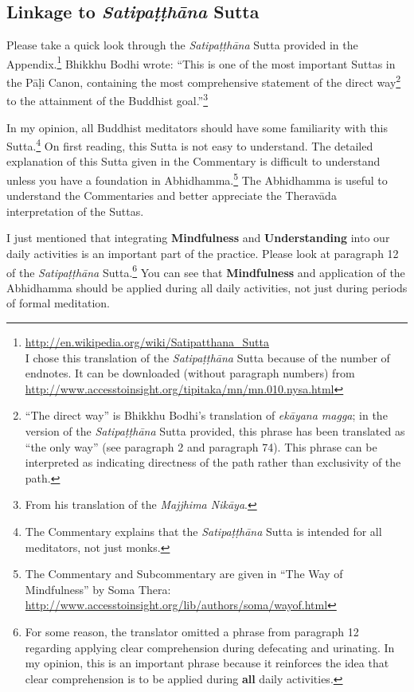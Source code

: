 \subsection*{Linkage to \textit{Satipaṭṭhāna} Sutta}

Please take a quick look through the \textit{Satipaṭṭhāna} Sutta provided in the Appendix.\footnote{\url{http://en.wikipedia.org/wiki/Satipatthana_Sutta} \\ I chose this translation of the \textit{Satipaṭṭhāna} Sutta because of the number of endnotes. It can be downloaded (without paragraph numbers) from \url{http://www.accesstoinsight.org/tipitaka/mn/mn.010.nysa.html}} Bhikkhu Bodhi wrote: “This is one of the most important Suttas in the Pāḷi Canon, containing the most comprehensive statement of the direct way\footnote{“The direct way” is Bhikkhu Bodhi's translation of \textit{ekāyana magga}; in the version of the \textit{Satipaṭṭhāna} Sutta provided, this phrase has been translated as “the only way” (see paragraph 2 and paragraph 74). This phrase can be interpreted as indicating directness of the path rather than exclusivity of the path.} to the attainment of the Buddhist goal.”\footnote{From his translation of the \textit{Majjhima Nikāya}.} 

In my opinion, all Buddhist meditators should have some familiarity with this Sutta.\footnote{The Commentary explains that the \textit{Satipaṭṭhāna} Sutta is intended for all meditators, not just monks.} On first reading, this Sutta is not easy to understand. The detailed explanation of this Sutta given in the Commentary is difficult to understand unless you have a foundation in Abhidhamma.\footnote{The Commentary and Subcommentary are given in “The Way of Mindfulness” by Soma Thera: \url{http://www.accesstoinsight.org/lib/authors/soma/wayof.html}} The Abhidhamma is useful to understand the Commentaries and better appreciate the Theravāda interpretation of the Suttas.

I just mentioned that integrating \textbf{Mindfulness} and \textbf{Understanding} into our daily activities is an important part of the practice. Please look at paragraph 12 of the \textit{Satipaṭṭhāna} Sutta.\footnote{For some reason, the translator omitted a phrase from paragraph 12 regarding applying clear comprehension during defecating and urinating. In my opinion, this is an important phrase because it reinforces the idea that clear comprehension is to be applied during \textbf{all} daily activities.} You can see that \textbf{Mindfulness} and application of the Abhidhamma should be applied during all daily activities, not just during periods of formal meditation.

